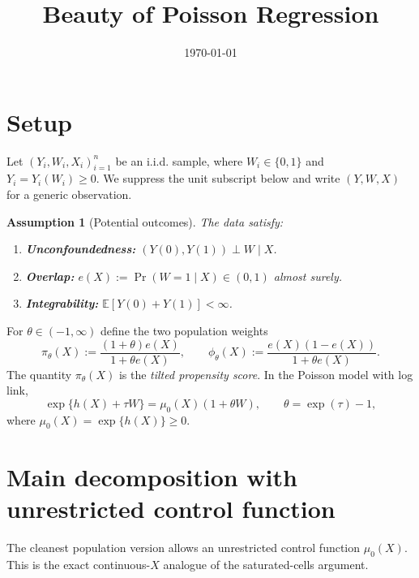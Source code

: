 \documentclass[11pt]{article}
\title{Beauty of Poisson Regression}
\author{}
\date{\today}
\newtheorem{assumption}{Assumption}
\newcommand{\E}{\mathbb{E}}
\newcommand{\1}{\mathbf{1}}
\begin{document}
\maketitle

\section{Setup}

Let $(Y_i,W_i,X_i)_{i=1}^n$ be an i.i.d. sample, where $W_i\in\{0,1\}$ and $Y_i=Y_i(W_i)\ge 0$. We suppress the unit subscript below and write $(Y,W,X)$ for a generic observation.

\begin{assumption}[Potential outcomes]
The data satisfy:
\begin{enumerate}[label=(\roman*)]
    \item \textbf{Unconfoundedness:} $(Y(0),Y(1)) \perp W \mid X$.
    \item \textbf{Overlap:} $e(X):=\Pr(W=1\mid X)\in(0,1)$ almost surely.
    \item \textbf{Integrability:} $\E[Y(0)+Y(1)]<\infty$.
\end{enumerate}
\end{assumption}

For $\theta\in(-1,\infty)$ define the two population weights
\begin{equation}
\pi_\theta(X):=\frac{(1+\theta)e(X)}{1+\theta e(X)},
\qquad
\phi_\theta(X):=\frac{e(X)(1-e(X))}{1+\theta e(X)}.
\label{eq:defweights}
\end{equation}
The quantity $\pi_\theta(X)$ is the \emph{tilted propensity score}. In the Poisson model with log link,
\[
\exp\{h(X)+\tau W\}=\mu_0(X)(1+\theta W),
\qquad \theta=\exp(\tau)-1,
\]
where $\mu_0(X)=\exp\{h(X)\}\ge 0$.

\section{Main decomposition with unrestricted control function}

The cleanest population version allows an unrestricted control function $\mu_0(X)$. This is the exact continuous-$X$ analogue of the saturated-cells argument.
\end{document}
